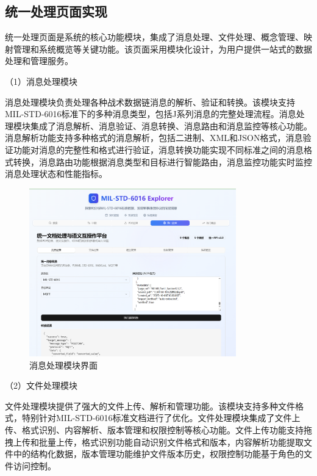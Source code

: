 \subsection{统一处理页面实现}

统一处理页面是系统的核心功能模块，集成了消息处理、文件处理、概念管理、映射管理和系统概览等关键功能。该页面采用模块化设计，为用户提供一站式的数据处理和管理服务。

（1）消息处理模块

消息处理模块负责处理各种战术数据链消息的解析、验证和转换。该模块支持MIL-STD-6016标准下的多种消息类型，包括J系列消息的完整处理流程。消息处理模块集成了消息解析、消息验证、消息转换、消息路由和消息监控等核心功能。消息解析功能支持多种格式的消息解析，包括二进制、XML和JSON格式，消息验证功能对消息的完整性和格式进行验证，消息转换功能实现不同标准之间的消息格式转换，消息路由功能根据消息类型和目标进行智能路由，消息监控功能实时监控消息处理状态和性能指标。

\begin{figure}[H]
\centering
\includegraphics[width=0.8\textwidth]{chapters/fig-0/front_trans.png}
\caption{消息处理模块界面}
\label{fig:frontend-message}
\end{figure}

（2）文件处理模块

文件处理模块提供了强大的文件上传、解析和管理功能。该模块支持多种文件格式，特别针对MIL-STD-6016标准文档进行了优化。文件处理模块集成了文件上传、格式识别、内容解析、版本管理和权限控制等核心功能。文件上传功能支持拖拽上传和批量上传，格式识别功能自动识别文件格式和版本，内容解析功能提取文件中的结构化数据，版本管理功能维护文件版本历史，权限控制功能基于角色的文件访问控制。


